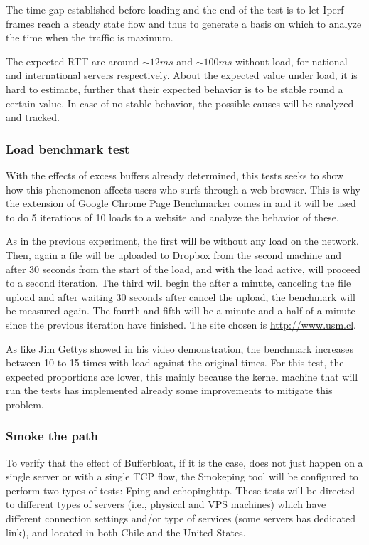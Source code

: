 The time gap established before loading and the end of the test is to let
Iperf frames reach a steady state flow and thus to generate a basis on which
to analyze the time when the traffic is maximum.

The expected RTT are around $\sim12ms$ and $\sim100ms$ without load, for
national and international servers respectively. About the expected value under
load, it is hard to estimate, further that their expected behavior is 
to be stable round a certain value. In case of no stable behavior, the possible 
causes will be analyzed and tracked.

\subsubsection{Load benchmark test}
With the effects of excess buffers already determined, this tests seeks to show
how this phenomenon affects users who surfs through a web browser. This is why
the extension of Google Chrome Page Benchmarker comes in and it will be used to
do 5 iterations of 10 loads to a website and analyze the behavior of these. 

As in the previous experiment, the first will be without any load on the
network. Then, again a file will be uploaded to Dropbox from the second machine
and after 30 seconds from the start of the load, and with the load active, will
proceed to a second iteration. The third will begin the after a minute,
canceling the file upload and after waiting 30 seconds after cancel the upload,
the benchmark will be measured again. The fourth and fifth will be a minute and
a half of a minute since the previous iteration have finished. The site chosen is
\url{http://www.usm.cl}.

As like Jim Gettys showed in his video demonstration\cite{gettysex}, the 
benchmark increases between 10 to 15 times with load against the original times. 
For this test, the expected proportions are lower, this mainly because the 
kernel machine that will run the tests has implemented already some improvements 
to mitigate this problem.

\subsubsection{Smoke the path}
To verify that the effect of Bufferbloat, if it is the case, does not just
happen on a single server or with a single TCP flow, the Smokeping tool will be
configured to perform two types of tests: Fping and echopinghttp. These tests
will be directed to different types of servers (i.e., physical and VPS machines)
which have different connection settings and/or type of services (some servers
has dedicated link), and located in both Chile and the United States.

